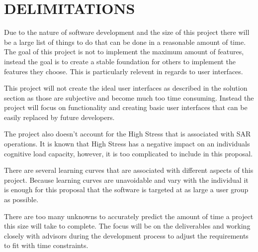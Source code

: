 % 	
\section{DELIMITATIONS}
Due to the nature of software development and the size of this project there
will be a large list of things to do that can be done in a reasonable amount of
time.  The goal of this project is not to implement the maximum amount of
features, instead the goal is to create a stable foundation for others to
implement the features they choose.  This is particularly relevent in regards to
user interfaces.  

This project will not create the ideal user interfaces as described in the
solution section as those are subjective and become much too time consuming. 
Instead the project will focus on functionality and creating basic user interfaces that can be
easily replaced by future developers.

The project also doesn't account for the High Stress that is associated with SAR
operations.  It is known that High Stress has a negative impact on an
individuals cognitive load capacity, however, it is too complicated to include in this proposal.  

There are several learning curves that are associated
with different aspects of this project.  Because learning curves are unavoidable
and vary with the individual it is enough for this proposal that the software is
targeted at as large a user group as possible.

There are too many unknowns to accurately predict the amount of time a project
this size will take to complete.  The focus will be on the deliverables and
working closely with advisors during the development process to adjust the
requirements to fit with time constraints.

